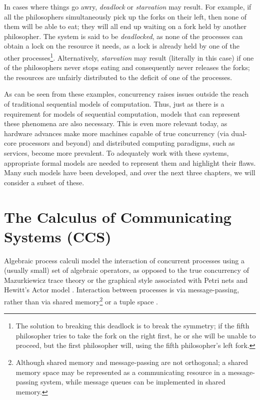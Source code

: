 In cases where things go awry, \emph{deadlock} or \emph{starvation}
may result.  For example, if all the philosophers simultaneously pick
up the forks on their left, then none of them will be able to eat;
they will all end up waiting on a fork held by another philosopher.
The system is said to be \emph{deadlocked}, as none of the processes
can obtain a lock on the resource it needs, as a lock is already held
by one of the other processes\footnote{The solution to breaking this
  deadlock is to break the symmetry; if the fifth philosopher tries to
  take the fork on the right first, he or she will be unable to
  proceed, but the first philosopher will, using the fifth
  philosopher's left fork.}.  Alternatively, \emph{starvation} may
result (literally in this case) if one of the philosophers never stops
eating and consequently never releases the forks; the resources are
unfairly distributed to the deficit of one of the processes.

As can be seen from these examples, concurrency raises issues outside
the reach of traditional sequential models of computation.  Thus, just
as there is a requirement for models of sequential computation, models
that can represent these phenomena are also necessary.  This is even
more relevant today, as hardware advances make more machines capable
of true concurrency (via dual-core processors and beyond) and
distributed computing paradigms, such as services, become more
prevalent.  To adequately work with these systems, appropriate formal
models are needed to represent them and highlight their flaws.  Many
such models have been developed, and over the next three chapters, we
will consider a subset of these.

\section{The Calculus of Communicating Systems (CCS)}

Algebraic process calculi model the interaction of concurrent
processes using a (usually small) set of algebraic operators, as
opposed to the true concurrency of Mazurkiewicz trace theory
\cite{maz:trace} or the graphical style associated with Petri nets
\cite{petri:phd} and Hewitt's Actor model \cite{hewitt:actor}.
Interaction between processes is via message-passing, rather than via
shared memory\footnote{Although shared memory and message-passing are
  not orthogonal; a shared memory space may be represented as a
  communicating resource in a message-passing system, while message
  queues can be implemented in shared memory.} or a tuple space
\cite{linda}.

